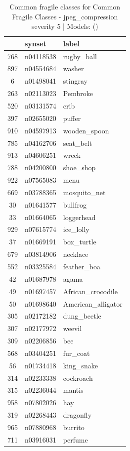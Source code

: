 \begin{table}
\caption{Common fragile classes for Common Fragile Classes - jpeg_compression severity 5 | Models: ()}
\label{tab:Common Fragile Classes - jpeg_compression severity 5_d41d8cd9}
\begin{tabular}{cll}
\toprule
 & synset & label \\
\midrule
768 & n04118538 & rugby_ball \\
897 & n04554684 & washer \\
6 & n01498041 & stingray \\
263 & n02113023 & Pembroke \\
520 & n03131574 & crib \\
397 & n02655020 & puffer \\
910 & n04597913 & wooden_spoon \\
785 & n04162706 & seat_belt \\
913 & n04606251 & wreck \\
788 & n04200800 & shoe_shop \\
922 & n07565083 & menu \\
669 & n03788365 & mosquito_net \\
30 & n01641577 & bullfrog \\
33 & n01664065 & loggerhead \\
929 & n07615774 & ice_lolly \\
37 & n01669191 & box_turtle \\
679 & n03814906 & necklace \\
552 & n03325584 & feather_boa \\
42 & n01687978 & agama \\
49 & n01697457 & African_crocodile \\
50 & n01698640 & American_alligator \\
305 & n02172182 & dung_beetle \\
307 & n02177972 & weevil \\
309 & n02206856 & bee \\
568 & n03404251 & fur_coat \\
56 & n01734418 & king_snake \\
314 & n02233338 & cockroach \\
315 & n02236044 & mantis \\
958 & n07802026 & hay \\
319 & n02268443 & dragonfly \\
965 & n07880968 & burrito \\
711 & n03916031 & perfume \\

\end{tabular}
\end{table}
